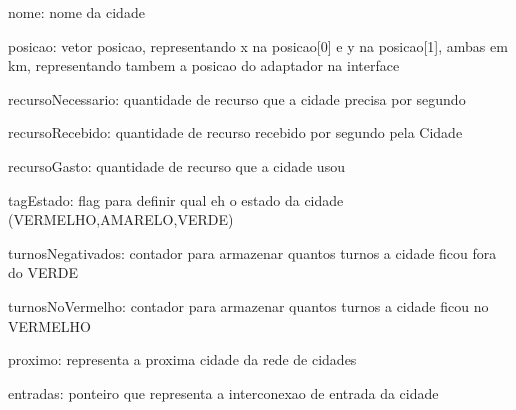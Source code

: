 nome\-: nome da cidade

posicao\-: vetor posicao, representando x na posicao\mbox{[}0\mbox{]} e y na posicao\mbox{[}1\mbox{]}, ambas em km, representando tambem a posicao do adaptador na interface

recurso\-Necessario\-: quantidade de recurso que a cidade precisa por segundo

recurso\-Recebido\-: quantidade de recurso recebido por segundo pela Cidade

recurso\-Gasto\-: quantidade de recurso que a cidade usou

tag\-Estado\-: flag para definir qual eh o estado da cidade (V\-E\-R\-M\-E\-L\-H\-O,A\-M\-A\-R\-E\-L\-O,V\-E\-R\-D\-E)

turnos\-Negativados\-: contador para armazenar quantos turnos a cidade ficou fora do V\-E\-R\-D\-E

turnos\-No\-Vermelho\-: contador para armazenar quantos turnos a cidade ficou no V\-E\-R\-M\-E\-L\-H\-O

proximo\-: representa a proxima cidade da rede de cidades

entradas\-: ponteiro que representa a interconexao de entrada da cidade 


